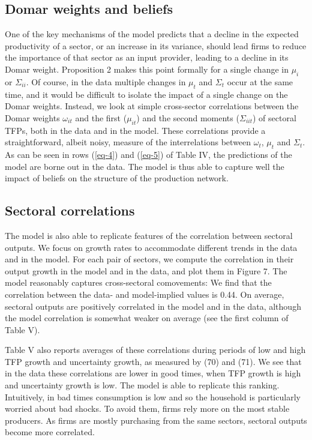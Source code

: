 \documentclass[11pt]{article}
\theoremstyle{definition}
\begin{document}
	\clearpage
	\subsection*{Domar weights and beliefs}
	One of the key mechanisms of the model predicts that a decline in the expected productivity of a sector, or an increase in its variance, should lead firms to reduce the importance of that sector as an input provider, leading to a decline in its Domar weight. Proposition 2 makes this point formally for a single change in $\mu_i$ or $\Sigma_{ii}$. Of course, in the data multiple changes in $\mu_t$ and $\Sigma_t$ occur at the same time, and it would be difficult to isolate the impact of a single change on the Domar weights. Instead, we look at simple cross-sector correlations between the Domar weights $\omega_{it}$ and the first ($\mu_{it}$) and the second moments ($\Sigma_{iit}$) of sectoral TFPs, both in the data and in the model. These correlations provide a straightforward, albeit noisy, measure of the interrelations between $\omega_t$, $\mu_t$ and $\Sigma_t$. As can be seen in rows (\ref{eq-4}) and (\ref{eq-5}) of Table IV, the predictions of the model are borne out in the data. The model is thus able to capture well the impact of beliefs on the structure of the production network.
	
	\subsection*{Sectoral correlations}
	The model is also able to replicate features of the correlation between sectoral outputs. We focus on growth rates to accommodate different trends in the data and in the model. For each pair of sectors, we compute the correlation in their output growth in the model and in the data, and plot them in Figure 7. The model reasonably captures cross-sectoral comovements: We find that the correlation between the data- and model-implied values is 0.44. On average, sectoral outputs are positively correlated in the model and in the data, although the model correlation is somewhat weaker on average (see the first column of Table V).
	
	Table V also reports averages of these correlations during periods of low and high TFP growth and uncertainty growth, as measured by (70) and (71). We see that in the data these correlations are lower in good times, when TFP growth is high and uncertainty growth is low. The model is able to replicate this ranking. Intuitively, in bad times consumption is low and so the household is particularly worried about bad shocks. To avoid them, firms rely more on the most stable producers. As firms are mostly purchasing from the same sectors, sectoral outputs become more correlated.
	
\end{document}

